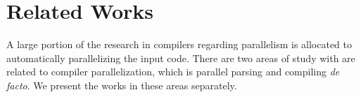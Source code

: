 
\newcommand{\sla}{\textbackslash}

\newcommand{\cmd}[1]{\textsf{#1}}

\newcommand{\pkg}[1]{\textsf{#1}}

\newcommand{\ltxcmd}[1]{\cmd{\sla{}#1}}

\chapter{Related Works}
\label{chap:related_works}

A large portion of the research in compilers regarding parallelism is allocated
to automatically parallelizing the input code. There are two areas of study
with are related to compiler parallelization, which is parallel parsing and
compiling \textit{de facto}. We present the works in these areas separately.


